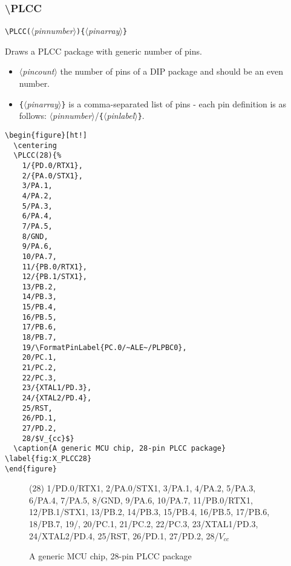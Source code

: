 \documentclass[english,a4paper,10pt]{article}
\newcommand\argu[1]{$\langle$\textit{#1}$\rangle$}
\newcommand\ARGU[1]{\texttt{\{}\argu{#1}\texttt{\}}}
\newcommand\arguD[1]{\texttt{(}\argu{#1}\texttt{)}}
\newcommand\verbinline{\lstinline[basicstyle=\normalsize\ttfamily]}
\begin{document}
\subsubsection{\ttfamily\textbackslash PLCC}
\verbinline|\PLCC|\arguD{pinnumber}\ARGU{pinarray}
\smallskip

Draws a PLCC package with generic number of pins.

\begin{itemize}
	\item \argu{pincount} the  number of pins of a DIP package and should be an even number.
	\item \ARGU{pinarray} is a comma-separated list of pins  - each pin definition is as follows: \argu{pinnumber}/\ARGU{pinlabel}.
\end{itemize}

\begin{minipage}[t]{0.65\linewidth}
\begin{lstlisting}
\begin{figure}[ht!]
  \centering
  \PLCC(28){%
  	1/{PD.0/RTX1},
  	2/{PA.0/STX1},
  	3/PA.1,										
  	4/PA.2,										
  	5/PA.3,										
  	6/PA.4,										
  	7/PA.5,										
  	8/GND,									
  	9/PA.6,
  	10/PA.7,
  	11/{PB.0/RTX1},
  	12/{PB.1/STX1},
  	13/PB.2,										
  	14/PB.3,										
  	15/PB.4,										
  	16/PB.5,										
  	17/PB.6,										
  	18/PB.7,										
  	19/\FormatPinLabel{PC.0/~ALE~/PLPBC0},
  	20/PC.1,										
  	21/PC.2,										
  	22/PC.3,										
  	23/{XTAL1/PD.3},
  	24/{XTAL2/PD.4},
  	25/RST,
  	26/PD.1,										
  	27/PD.2,										
  	28/$V_{cc}$}								
  \caption{A generic MCU chip, 28-pin PLCC package} \label{fig:X_PLCC28}
\end{figure}
\end{lstlisting}%
\end{minipage}\hfill

\begin{figure}[ht!]
  \centering
  \PLCC(28){%
  	1/{PD.0/RTX1},
  	2/{PA.0/STX1},
  	3/PA.1,										
  	4/PA.2,										
  	5/PA.3,										
  	6/PA.4,										
  	7/PA.5,										
  	8/GND,									
  	9/PA.6,										
  	10/PA.7,										
  	11/{PB.0/RTX1},
  	12/{PB.1/STX1},
  	13/PB.2,
  	14/PB.3,
  	15/PB.4,
  	16/PB.5,
  	17/PB.6,
  	18/PB.7,
  	19/,
  	20/PC.1,
  	21/PC.2,
  	22/PC.3,
  	23/{XTAL1/PD.3},
  	24/{XTAL2/PD.4},
  	25/RST,
  	26/PD.1,
  	27/PD.2,
  	28/$V_{cc}$}
  \caption{A generic MCU chip, 28-pin PLCC package} \label{fig:X_PLCC28}
\end{figure}
\end{document}
